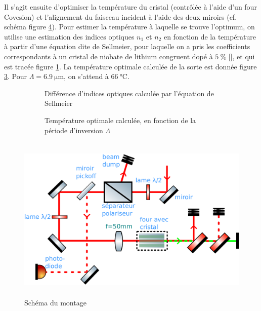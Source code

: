 \documentclass[11pt,a4paper] { article}
\newcommand{\ncite}[1]{[\citenum{#1}]}
\begin{document}
 Il s'agit ensuite d'optimiser la température du cristal (contrôlée à l'aide d'un four Covesion) et l'alignement du faisceau incident à l'aide des deux miroirs (cf. schéma figure \ref{fig:montage}). Pour estimer la température à laquelle se trouve l'optimum, on utilise une estimation des indices optiques $n_1$ et $n_2$ en fonction de la température à partir d'une équation dite de Sellmeier, pour laquelle on a pris les coefficients correspondants à un cristal de niobate de lithium congruent dopé à $\SI{5}{\percent}$ \ncite{gayer,covesion}, et qui est tracée figure \ref{fig:sellmeier}. La température optimale calculée de la sorte est donnée figure \ref{fig:lp}. Pour $\Lambda = \SI{6.9}{\micro\meter}$, on s'attend à $\SI{66}{\celsius}$.

\begin{figure}[htpb] 
\centering
\hspace*{-0.8cm}
\begin{subfigure}[b]{0.48\textwidth}
	\centering
	
	\caption{Différence d'indices optiques calculée par l'équation de Sellmeier}
	\label{fig:sellmeier}
\end{subfigure}
\centering
\hspace*{0.8cm}
\begin{subfigure}[b]{0.48\textwidth}
	
	\caption{Température optimale calculée, en fonction de la période d'inversion $\Lambda$}
    \label{fig:lp}
\end{subfigure}
\caption{}
\end{figure}



\begin{figure}[h]
	\centering
	\includegraphics[height=8cm]{./img/schema.pdf}
	\caption{Schéma du montage}
	\label{fig:montage}
\end{figure}
\end{document}
